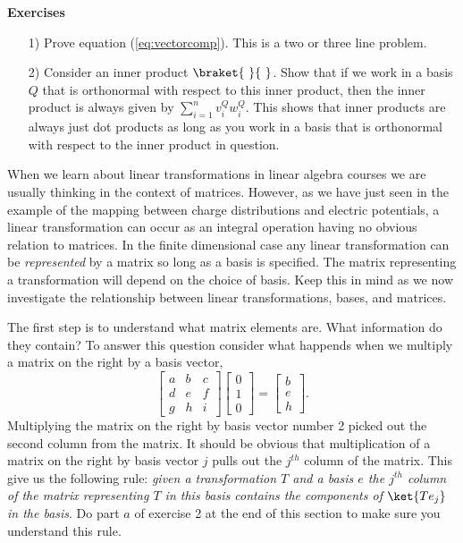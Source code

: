 \begin{flushleft}\textbf{Exercises}\end{flushleft}
\begin{itemize}
\item[1)] Prove equation (\ref{eq:vectorcomp}).  This is a two or three line problem.
\item[2)] Consider an inner product $\braket{~}{~}$.  Show that if we work in a basis $Q$ that is orthonormal with respect to this inner product, then the inner product is always given by $\sum_{i=1}^n v_i^Q w_i^Q$.  This shows that inner products are always just dot products as long as you work in a basis that is orthonormal with respect to the inner product in question.
\end{itemize}

When we learn about linear transformations in linear algebra courses we are usually thinking in the context of matrices.  However, as we have just seen in the example of the mapping between charge distributions and electric potentials, a linear transformation can occur as an integral operation having no obvious relation to matrices.  In the finite dimensional case any linear transformation can be \emph{represented} by a matrix so long as a basis is specified.  The matrix representing a transformation will depend on the choice of basis.  Keep this in mind as we now investigate the relationship between linear transformations, bases, and matrices.

The first step is to understand what matrix elements are.  What information do they contain?  To answer this question consider what happends when we multiply a matrix on the right by a basis vector,
\begin{displaymath}\left[ \begin{array}{ccc} a&b&c\\d&e&f\\g&h&i \end{array} \right] \left[ \begin{array}{c} 0\\1\\0 \end{array} \right] = \left[ \begin{array}{c} b\\e\\h \end{array} \right]. \end{displaymath}
Multiplying the matrix on the right by basis vector number 2 picked out the second column from the matrix.  It should be obvious that multiplication of a matrix on the right by basis vector $j$ pulls out the $j^{th}$ column of the matrix.  This give us the following rule: \emph{given a transformation $T$ and a basis $e$ the $j^{th}$ column of the matrix representing $T$ in this basis contains the components of $\ket{Te_j}$ in the basis}.  Do part $a$ of exercise 2 at the end of this section to make sure you understand this rule.

